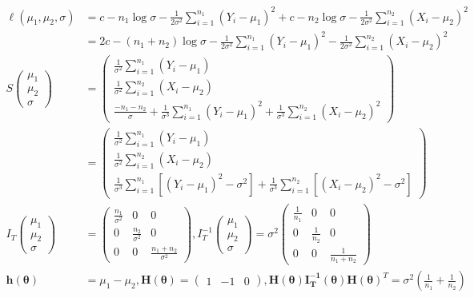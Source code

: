 \documentclass[
  letterpaper,
  DIV=11,
  numbers=noendperiod]{scrreprt}
\begin{document}
\[\begin{aligned}
\ell (\mu_1,\mu_2,\sigma) &= c-n_1\log \sigma - \frac 1 {2\sigma^2} \sum_{i=1}^{n_1}(Y_i-\mu_1)^2 +c-n_2\log \sigma - \frac 1 {2\sigma^2} \sum_{i=1}^{n_2}(X_i-\mu_2)^2\\
&= 2c-(n_1+n_2)\log \sigma - \frac 1 {2\sigma^2} \sum_{i=1}^{n_1}(Y_i-\mu_1)^2 - \frac 1 {2\sigma^2} \sum_{i=1}^{n_2}(X_i-\mu_2)^2 \\
S\begin{pmatrix} \mu_1 \\ \mu_2 \\\sigma \end{pmatrix} 
&=\begin{pmatrix} \frac 1 {\sigma^2} \sum_{i=1}^{n_1} (Y_i-\mu_1)\\
\frac 1 {\sigma^2} \sum_{i=1}^{n_2} (X_i-\mu_2)\\
\frac{-n_1-n_2}{\sigma} +\frac 1 {\sigma^3} \sum_{i=1}^{n_1} (Y_i-\mu_1)^2 +\frac 1 {\sigma^3} \sum_{i=1}^{n_2} (X_i-\mu_2)^2 \end{pmatrix}\\
&=\begin{pmatrix} \frac 1 {\sigma^2} \sum_{i=1}^{n_1} (Y_i-\mu_1)\\
\frac 1 {\sigma^2} \sum_{i=1}^{n_2} (X_i-\mu_2)\\
\frac 1 {\sigma^3} \sum_{i=1}^{n_1} [(Y_i-\mu_1)^2-\sigma^2] +\frac 1 {\sigma^3} \sum_{i=1}^{n_2} [(X_i-\mu_2)^2 - \sigma^2] \end{pmatrix}\\
I_T \begin{pmatrix} \mu_1 \\ \mu_2 \\\sigma \end{pmatrix}
&= \begin{pmatrix} \frac {n_1} {\sigma^2} &0&0\\
0&\frac {n_2} {\sigma^2} & 0\\
0&0& \frac{n_1+n_2}{\sigma^2}\end{pmatrix},
I_T^{-1} \begin{pmatrix} \mu_1 \\ \mu_2 \\\sigma \end{pmatrix}
= \sigma^2 \begin{pmatrix} \frac {1} {n_1} &0&0\\
0&\frac {1} {n_2} & 0\\
0&0& \frac 1 {n_1+n_2}\end{pmatrix} \\
\mathbf h( \boldsymbol {\theta}) &= \mu_1-\mu_2 ,
\mathbf H(\boldsymbol \theta) = \begin{pmatrix} 1 & -1 &0\end{pmatrix}, \mathbf H(\boldsymbol \theta) \mathbf {I_T^{-1}}(\boldsymbol {\theta}) \mathbf H(\boldsymbol \theta)^T= \sigma^2 \left(\frac 1 {n_1} +\frac 1 {n_2}\right)
\end{aligned}\]
\end{document}
